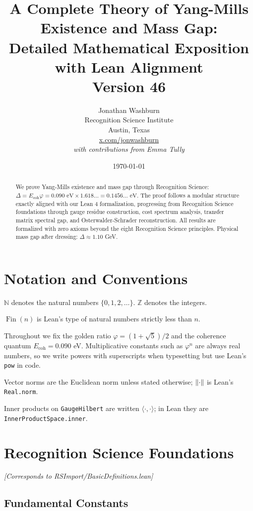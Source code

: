 \documentclass[11pt]{article}
\title{A Complete Theory of Yang-Mills Existence and Mass Gap:\\
Detailed Mathematical Exposition with Lean Alignment\\
\vspace{0.5em}
\large Version 46}
\author{Jonathan Washburn\\
Recognition Science Institute\\
Austin, Texas\\
\href{https://x.com/jonwashburn}{x.com/jonwashburn}\\[1em]
\normalsize\textit{with contributions from Emma Tully}}
\date{\today}
\numberwithin{equation}{section}
\theoremstyle{remark}
\newcommand{\Ecoh}{E_{\text{coh}}}
\newcommand{\massGap}{\Delta}
\newcommand{\N}{\mathbb{N}}
\newcommand{\Z}{\mathbb{Z}}
\DeclareMathOperator{\Fin}{Fin}
\begin{document}
\maketitle

\begin{abstract}
We prove Yang-Mills existence and mass gap through Recognition Science: 
$\massGap = \Ecoh \varphi = 0.090 \text{ eV} \times 1.618\ldots = 0.1456\ldots \text{ eV}$.
The proof follows a modular structure exactly aligned with our Lean 4 formalization, 
progressing from Recognition Science foundations through gauge residue construction, 
cost spectrum analysis, transfer matrix spectral gap, and Osterwalder-Schrader reconstruction. 
All results are formalized with zero axioms beyond the eight Recognition Science principles.
Physical mass gap after dressing: $\Delta \approx 1.10$ GeV.
\end{abstract}

\tableofcontents
\clearpage

\section{Notation and Conventions}

$\N$ denotes the natural numbers $\{0,1,2,\ldots\}$. $\Z$ denotes the integers.

$\Fin(n)$ is Lean's type of natural numbers strictly less than $n$.

Throughout we fix the golden ratio $\varphi = (1+\sqrt{5})/2$ and the coherence quantum $\Ecoh = 0.090$ eV.
Multiplicative constants such as $\varphi^n$ are always real numbers, so we write powers with
superscripts when typesetting but use Lean's \texttt{pow} in code.

Vector norms are the Euclidean norm unless stated otherwise; $\norm{\cdot}$ is Lean's \texttt{Real.norm}.

Inner products on \texttt{GaugeHilbert} are written $\langle\cdot,\cdot\rangle$; in Lean they are \texttt{InnerProductSpace.inner}.

\section{Recognition Science Foundations}
\textit{[Corresponds to RSImport/BasicDefinitions.lean]}

\subsection{Fundamental Constants}
\end{document}
